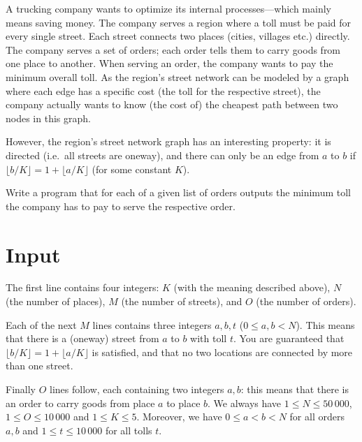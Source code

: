 
\noindent
A trucking company wants to optimize its internal processes---which mainly means saving money. The company serves a region where a toll must be paid for every single street.  Each street connects two places (cities, villages etc.) directly.  The company serves a set of orders; each order tells them to carry goods from one place to another.  When serving an order, the company wants to pay the minimum overall toll.  As the region's street network can be modeled by a graph where each edge has a specific cost (the toll for the respective street), the company actually wants to know (the cost of) the cheapest path between two nodes in this graph.

However, the region's street network graph has an interesting property: it is directed (i.e.~all streets are oneway), and there can only be an edge from $a$ to $b$ if $\lfloor b/K\rfloor = 1 + \lfloor a/K\rfloor$ (for some constant $K$).

Write a program that for each of a given list of orders outputs the minimum toll the company has to pay to serve the respective order.

\section*{Input}

The first line contains four integers: $K$ (with the meaning described above), $N$ (the number of places), $M$ (the number of streets), and $O$ (the number of orders).

Each of the next $M$ lines contains three integers $a,b,t$ ($0 \leq a, b < N$). This means that there is a (oneway) street from $a$ to $b$ with toll $t$. You are guaranteed that $\lfloor b/K\rfloor = 1 + \lfloor a/K\rfloor$ is satisfied, and that no two locations are connected by more than one street.

Finally $O$ lines follow, each containing two integers $a,b$: this means that there is an order to carry goods from place $a$ to place $b$.
%
We always have $1 \leq N \leq 50\,000$, $1 \leq O \leq 10\,000$ and $1 \leq K\leq 5$. Moreover, we have $0 \leq a < b < N$ for all orders $a,b$ and $1 \leq t \leq 10\,000$ for all tolls $t$. 

